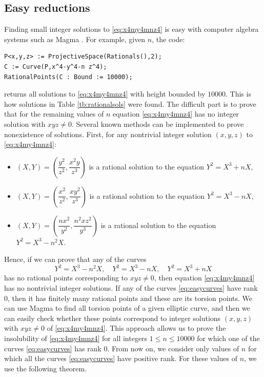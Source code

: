 \documentclass[a4paper,12pt,english,reqno]{amsart}
\begin{document}
\subsection{Easy reductions}\label{sec:easy}
Finding small integer solutions to \eqref{eq:x4my4mnz4} is easy with computer algebra systems such as Magma \cite{MR1484478}. For example, given $n$, the code:
\begin{lstlisting}
P<x,y,z> := ProjectiveSpace(Rationals(),2); 
C := Curve(P,x^4-y^4-n z^4); 
RationalPoints(C : Bound := 10000);
\end{lstlisting}
returns all solutions to \eqref{eq:x4my4mnz4} with height bounded by $10000$. This is how solutions in Table \ref{tb:rationalsols} were found. The difficult part is to prove that for the remaining values of $n$ equation \eqref{eq:x4my4mnz4} has no integer solution with $xyz \neq 0$. Several known methods can be implemented to prove nonexistence of solutions.
First, for any nontrivial integer solution $(x,y,z)$ to \eqref{eq:x4my4mnz4}:
\begin{itemize} 
	\item[] $(X,Y)=\left(\dfrac{y^2}{z^2},\dfrac{x^2y}{z^3}\right)$ is a rational solution to the equation $Y^2=X^3+nX$, 
	\item[] $(X,Y)=\left(\dfrac{x^2}{z^2},\dfrac{xy^2}{z^3}\right)$ is a rational solution to the equation $Y^2=X^3-nX$, 
	\item[] $(X,Y)=\left(\dfrac{nx^2}{y^2},\dfrac{n^2xz^2}{y^3}\right)$ is a rational solution to the equation $Y^2=X^3-n^2X$.
\end{itemize}
Hence, if we can prove that any of the curves
\begin{equation}\label{eq:easycurves}
Y^2=X^3-n^2X, \quad Y^2=X^3-nX, \quad Y^2=X^3+nX
\end{equation}
has no rational points corresponding to $xyz \neq 0$, then equation \eqref{eq:x4my4mnz4} has no nontrivial integer solutions. If any of the curves \eqref{eq:easycurves} have rank $0$, then it has finitely many rational points and these are its torsion points. We can use Magma \cite{MR1484478} to find all torsion points of a given elliptic curve, and then we can easily check whether these points correspond to integer solutions $(x,y,z)$ with $xyz \neq 0$ of \eqref{eq:x4my4mnz4}. This approach allows us to prove the insolubility of \eqref{eq:x4my4mnz4} for all integers $1\leq n \leq 10000$ for which one of the curves \eqref{eq:easycurves} has rank $0$. From now on, we consider only values of $n$ for which all the curves \eqref{eq:easycurves} have positive rank. For these values of $n$, we use the following theorem.  
	
\end{document}
